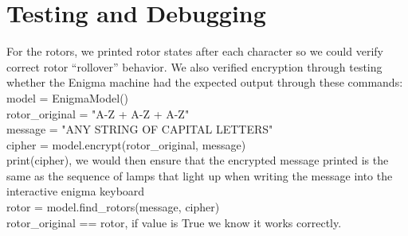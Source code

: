 \documentclass[12pt]{article}
\begin{document}
\section{Testing and Debugging}
For the rotors, we printed rotor states after each character so we could verify correct rotor “rollover” behavior. 
We also verified encryption through testing whether the Enigma machine had the expected output through these commands:\\ 
model = EnigmaModel()\\
rotor\_original = "A-Z + A-Z + A-Z" \\
message = "ANY STRING OF CAPITAL LETTERS" \\
cipher = model.encrypt(rotor\_original, message) \\
print(cipher), we would then ensure that the encrypted message printed is the same as the sequence of lamps that light up when writing the message into the interactive enigma keyboard \\
rotor = model.find\_rotors(message, cipher) \\
rotor\_original == rotor, if value is True we know it works correctly. \\

\end{document}
